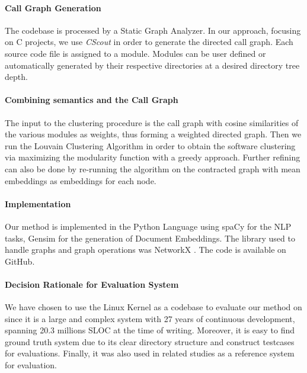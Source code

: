 \documentclass[sigconf,review, anonymous]{acmart}
\begin{document}

\paragraph{Call Graph Generation} The codebase is processed by a Static Graph Analyzer. In our approach, focusing on C projects, we use \emph{CScout} \cite{cscout} in order to generate the directed call graph. Each source code file is assigned to a module. Modules can be user defined or automatically generated by their respective directories at a desired directory tree depth. 

\paragraph{Combining semantics and the Call Graph} The input to the clustering procedure
 is the call graph with cosine similarities of the various modules as weights, thus forming a
  weighted directed graph. Then we run the Louvain Clustering Algorithm \cite{louvain} in
   order to obtain the software clustering via maximizing the modularity function with a
    greedy approach. Further refining can also be done by re-running the algorithm on the contracted graph with mean embeddings as embeddings for each node.  

\paragraph{Implementation}  Our method is implemented in the Python Language using spaCy\cite{spacy} for the 
NLP tasks, Gensim \cite{gensim} for the generation of Document Embeddings. The library 
used to handle graphs and graph operations was NetworkX \cite{nx}. The code is available on GitHub.

\paragraph{Decision Rationale for Evaluation System} We have chosen to use the Linux Kernel as a codebase to evaluate our method on since it is a large and complex system with 27 years of continuous development, spanning 20.3 millions SLOC at the time of writing.  Moreover, it is easy to find ground truth system due to its clear directory structure and construct testcases for
evaluations. Finally, it was also used in related studies \cite{acdc, evaluation} as a reference system for evaluation. 
\end{document}
